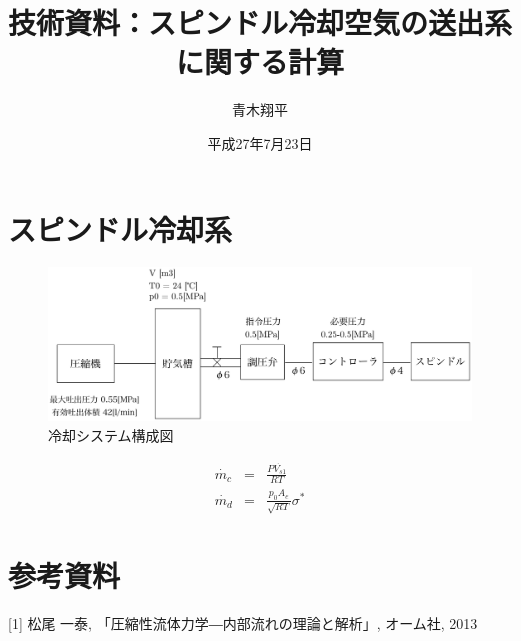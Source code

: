 \documentclass{jsarticle}
\begin{document}
\title{技術資料：スピンドル冷却空気の送出系に関する計算}
\author{青木翔平}
\date{平成27年7月23日}

\section{スピンドル冷却系}

\begin{figure}[htbp]
 \centering
 \includegraphics[width=150mm]{system.pdf}
 \caption{冷却システム構成図}
 \label{fig:solar_massage}
\end{figure}

\begin{eqnarray}
  \dot{m_c} & = &  \frac{P\dot{V_{s1}}}{RT}  \\
  \dot{m_d} & = & \frac{p_0 A_e }{\sqrt{R T}}\sigma^{*}
\end{eqnarray}

\section{参考資料}
[1] 松尾 一泰, 「圧縮性流体力学―内部流れの理論と解析」, オーム社, 2013
\end{document}
